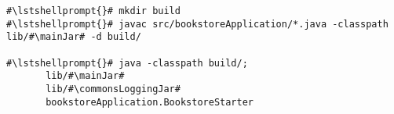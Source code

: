 \begin{lstlisting}[caption=Commands to compile and run the instrumented Bookstore under Windows,label=lst:bookstoreStarterWin]
#\lstshellprompt{}# mkdir build
#\lstshellprompt{}# javac src/bookstoreApplication/*.java -classpath lib/#\mainJar# -d build/

#\lstshellprompt{}# java -classpath build/;
       lib/#\mainJar#
       lib/#\commonsLoggingJar#
       bookstoreApplication.BookstoreStarter 
\end{lstlisting}
